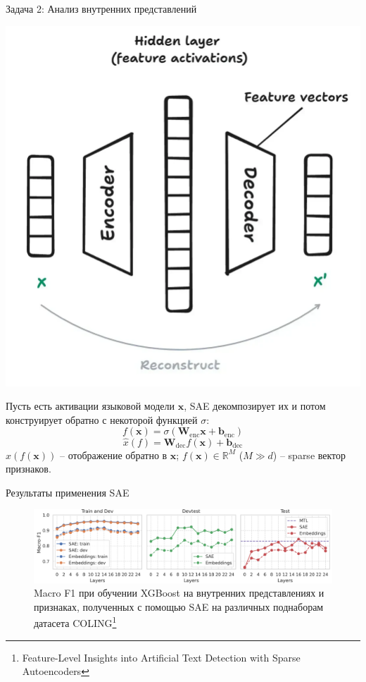 \documentclass{beamer}
\newcommand{\vx}{\mathbf{x}}
\newcommand{\vW}{\mathbf{W}}
\newcommand{\vb}{\mathbf{b}}
\begin{document}
\begin{frame}{Задача 2: Анализ внутренних представлений}

    \centering
    \begin{minipage}{0.48\textwidth}
        \centering
        \includegraphics[width=\linewidth]{images_sem2/scheme_sae.png}
    \end{minipage}\hfill
    \begin{minipage}{0.48\textwidth}
        \centering
        Пусть есть активации языковой модели $\vx$, SAE декомпозирует их и потом конструирует обратно с некоторой функцией $\sigma$:
        $$f(\vx) = \sigma(\vW_{\text{enc}} \vx + \vb_{\text{enc}})$$
        $$\hat{x}(f) = \vW_{\text{dec}} f(\vx) + \vb_{\text{dec}}$$
        $\hat{x}(f(\vx))$ -- отображение обратно в $\vx$;
        $f(\vx) \in \mathbb{R}^M$ ($M \gg d$) -- sparse вектор признаков. 
    \end{minipage}

\end{frame}

\begin{frame}{Результаты применения SAE}
    \begin{figure}[t] 
    \centering
    \includegraphics[width=\textwidth]{images_sem2/main_metrics.png} 
    \caption{Macro F1 при обучении XGBoost на внутренних представлениях и признаках, полученных с помощью SAE на различных поднаборам датасета COLING\footnote{Feature-Level Insights into Artificial Text Detection with Sparse Autoencoders}}
    \label{fig:main_metrics}
\end{figure}
\end{frame}
\end{document}
